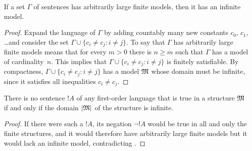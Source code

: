 \documentclass[open-logic-section]{subfiles}
\begin{document}

\begin{thm}
  If a set $\Gamma$ of sentences has arbitrarily large finite models,
  then it has an infinite model.
\end{thm}

\begin{proof}
  Expand the language of $\Gamma$ by adding countably many new
  constants $c_0$, $c_1$, \dots and consider the set $\Gamma \cup
  \{c_i \neq c_j : i \neq j\}$. To say that $\Gamma$ has arbitrarily
  large finite models means that for every $m >0$ there is $n\ge m$
  such that $\Gamma$ has a model of cardinality~$n$. This implies that
  $\Gamma \cup \{c_i \neq c_j : i \neq j\}$ is finitely
  satisfiable. By compactness, $\Gamma \cup \{c_i \neq c_j : i \neq
  j\}$ has a model $\mathfrak M$ whose domain must be infinite, since it
  satisfies all inequalities $c_i \neq c_j$.
\end{proof}

\begin{prop}
  There is no sentence $!A$ of any first-order language
  that is true in a structure $\mathfrak M$ if and only
  if the domain $\left| \mathfrak M \right|$ of the structure is infinite.
\end{prop}

\begin{proof}
  If there were such a $!A$, its negation $\lnot !A$ would
  be true in all and only the finite structures, and it would
  therefore have arbitrarily large finite models but it would lack an
  infinite model, contradicting .
\end{proof}
\end{document}
